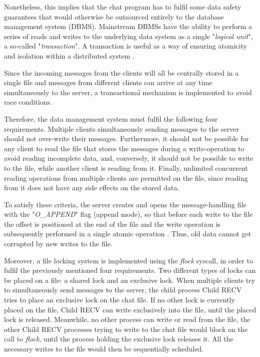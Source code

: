 Nonetheless, this implies that the chat program has to fulfil some data safety guarantees that would otherwise be outsourced entirely to the database management system (DBMS). Mainstream DBMSs have the ability to perform a series of reads and writes to the underlying data system as a single "\textit{logical unit}", a so-called "\textit{transaction}". A transaction is useful as a way of ensuring atomicity and isolation within a distributed system \cite{Kleppmann2017}.

Since the incoming messages from the clients will all be centrally stored in a single file and messages from different clients can arrive at any time simultaneously to the server, a transactional mechanism is implemented to avoid race conditions. 

Therefore, the data management system must fulfil the following four requirements. Multiple clients simultaneously sending messages to the server should not over-write their messages. Furthermore, it should not be possible for any client to read the file that stores the messages during a write-operation to avoid reading incomplete data, and, conversely, it should not be possible to write to the file, while another client is reading from it. Finally, unlimited concurrent reading operations from multiple clients are permitted on the file, since reading from it does not have any side effects on the stored data.

To satisfy these criteria, the server creates and opens the message-handling file with the "\textit{O\_APPEND}" flag (append mode), so that before each write to the file the offset is positioned at the end of the file and the write operation is subsequently performed in a single atomic operation \cite{Kerrisk2010}. Thus, old data cannot get corrupted by new writes to the file.

Moreover, a file locking system is implemented using the \textit{flock} syscall, in order to fulfil the previously mentioned four requirements. Two different types of locks can be placed on a file: a shared lock and an exclusive lock. When multiple clients try to simultaneously send messages to the server, the child process Child RECV tries to place an exclusive lock on the chat file.  If no other lock is currently placed on the file, Child RECV can write exclusively into the file, until the placed lock is released. Meanwhile, no other process can write or read from the file, the other Child RECV processes trying to write to the chat file would block on the call to \textit{flock}, until the process holding the exclusive lock releases it. All the necessary writes to the file would then be sequentially scheduled.

